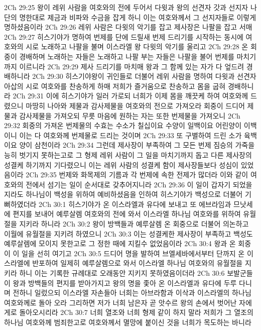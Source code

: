 2Ch 29:25  왕이 레위 사람을 여호와의 전에 두어서 다윗과 왕의 선견자 갓과 선지자 나단의 명한대로 제금과 비파와 수금을 잡게 하니 이는 여호와께서 그 선지자들로 이렇게 명하셨음이라
2Ch 29:26  레위 사람은 다윗의 악기를 잡고 제사장은 나팔을 잡고 서매
2Ch 29:27  히스기야가 명하여 번제를 단에 드릴새 번제 드리기를 시작하는 동시에 여호와의 시로 노래하고 나팔을 불며 이스라엘 왕 다윗의 악기를 울리고
2Ch 29:28  온 회중이 경배하며 노래하는 자들은 노래하고 나팔 부는 자들은 나팔을 불어 번제를 마치기까지 이르니라
2Ch 29:29  제사 드리기를 마치매 왕과 그 함께 있는 자가 다 엎드려 경배하니라
2Ch 29:30  히스기야왕이 귀인들로 더불어 레위 사람을 명하여 다윗과 선견자 아삽의 시로 여호와를 찬송하게 하매 저희가 즐거움으로 찬송하고 몸을 굽혀 경배하니라
2Ch 29:31  이에 히스기야가 일러 가로되 너희가 이제 몸을 깨끗케 하여 여호와께 드렸으니 마땅히 나아와 제물과 감사제물을 여호와의 전으로 가져오라 회중이 드디어 제물과 감사제물을 가져오되 무릇 마음에 원하는 자는 또한 번제물을 가져오니
2Ch 29:32  회중의 가져온 번제물의 수효는 수소가 칠십이요 수양이 일백이요 어린양이 이백이니 이는 다 여호와께 번제물로 드리는 것이며
2Ch 29:33  또 구별하여 드린 소가 육백이요 양이 삼천이라
2Ch 29:34  그런데 제사장이 부족하여 그 모든 번제 짐승의 가죽을 능히 벗기지 못하는고로 그 형제 레위 사람이 그 일을 마치기까지 돕고 다른 제사장의 성결케 하기까지 기다렸으니 이는 레위 사람의 성결케 함이 제사장들보다 성심이 있었음이라
2Ch 29:35  번제와 화목제의 기름과 각 번제에 속한 전제가 많더라 이와 같이 여호와의 전에서 섬기는 일이 순서대로 갖추어지니라
2Ch 29:36  이 일이 갑자기 되었을지라도 하나님이 백성을 위하여 예비하셨음을 인하여 히스기야가 백성으로 더불어 기뻐하였더라
2Ch 30:1  히스기야가 온 이스라엘과 유다에 보내고 또 에브라임과 므낫세에 편지를 보내어 예루살렘 여호와의 전에 와서 이스라엘 하나님 여호와를 위하여 유월절을 지키라 하니라
2Ch 30:2  왕이 방백들과 예루살렘 온 회중으로 더불어 의논하고 이월에 유월절을 지키려 하였으니
2Ch 30:3  이는 성결케한 제사장이 부족하고 백성도 예루살렘에 모이지 못한고로 그 정한 때에 지킬수 없었음이라
2Ch 30:4  왕과 온 회중이 이 일을 선히 여기고
2Ch 30:5  드디어 명을 발하여 브엘세바에서부터 단까지 온 이스라엘에 반포하여 일제히 예루살렘으로 와서 이스라엘 하나님 여호와의 유월절을 지키라 하니 이는 기록한 규례대로 오래동안 지키지 못하였음이더라
2Ch 30:6  보발군들이 왕과 방백들의 편지를 받아가지고 왕의 명을 좇아 온 이스라엘과 유다에 두루 다니며 전하니 일렀으되 이스라엘 자손들아 너희는 아브라함과 이삭과 이스라엘의 하나님 여호와께로 돌아 오라 그리하면 저가 너희 남은자 곧 앗수르 왕의 손에서 벗어난 자에게로 돌아오시리라
2Ch 30:7  너희 열조와 너희 형제 같이 하지 말라 저희가 그 열조의 하나님 여호와께 범죄한고로 여호와께서 멸망에 붙이신 것을 너희가 목도하는 바니라
